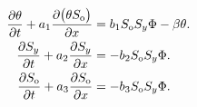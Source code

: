 \documentclass[
    8pt,
    aspectratio=1610,
    c,
    intlimits,
		handout,
    leqno,
    professionalfonts,
]{beamer}
\begin{document}
\begin{frame}
	\begin{align}
		\diffp{\theta}{t}+
		a_{1}
		\diffp{
			\big(
			\theta
			S_{\text{o}}
			\big)
		}{x}                    & =
		b_{1}
		S_{\text{o}}
		S_{y}
		\Phi-
		\beta\theta.
		\label{eq:6}                \\
		\diffp{S_{y}}{t}+
		a_{2}
		\diffp{S_{y}}{x}        & =
		-b_{2}
		S_{\text{o}}
		S_{y}
		\Phi.
		\label{eq:7}                \\
		\diffp{S_{\text{o}}}{t}+
		a_{3}
		\diffp{S_{\text{o}}}{x} & =
		-b_{3}
		S_{\text{o}}
		S_{y}
		\Phi.
		\label{eq:8}
	\end{align}
\end{frame}
\end{document}
